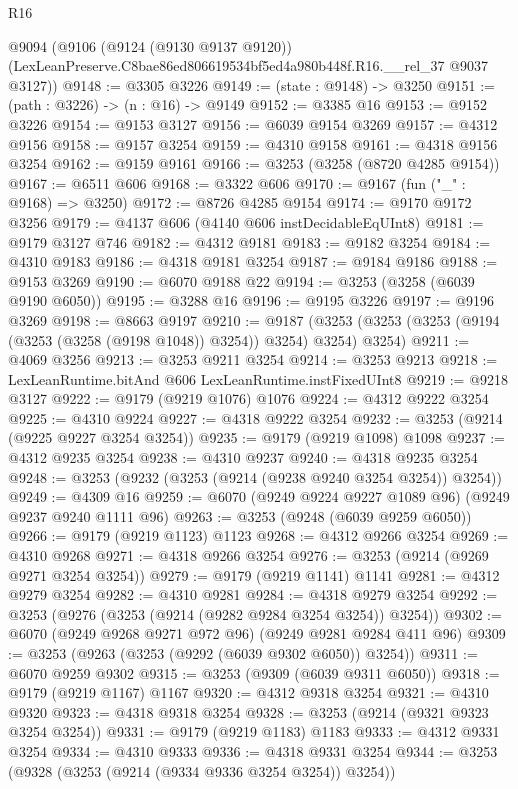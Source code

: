 \begin{lexlean}{R16}
\begin{coremodule}
  @9094
    (@9106
      (@9124 (@9130 @9137 @9120))
      (LexLeanPreserve.C8bae86ed806619534bf5ed4a980b448f.R16.__rel_37 @9037 @3127))
@9148 := @3305 @3226
@9149 := (state : @9148) -> @3250
@9151 := (path : @3226) -> (n : @16) -> @9149
@9152 := @3385 @16
@9153 := @9152 @3226
@9154 := @9153 @3127
@9156 := @6039 @9154 @3269
@9157 := @4312 @9156
@9158 := @9157 @3254
@9159 := @4310 @9158
@9161 := @4318 @9156 @3254
@9162 := @9159 @9161
@9166 := @3253 (@3258 (@8720 @4285 @9154))
@9167 := @6511 @606
@9168 := @3322 @606
@9170 := @9167 (fun ("_" : @9168) => @3250)
@9172 := @8726 @4285 @9154
@9174 := @9170 @9172 @3256
@9179 := @4137 @606 (@4140 @606 instDecidableEqUInt8)
@9181 := @9179 @3127 @746
@9182 := @4312 @9181
@9183 := @9182 @3254
@9184 := @4310 @9183
@9186 := @4318 @9181 @3254
@9187 := @9184 @9186
@9188 := @9153 @3269
@9190 := @6070 @9188 @22
@9194 := @3253 (@3258 (@6039 @9190 @6050))
@9195 := @3288 @16
@9196 := @9195 @3226
@9197 := @9196 @3269
@9198 := @8663 @9197
@9210 := @9187 (@3253 (@3253 (@3253 (@9194 (@3253 (@3258 (@9198 @1048)) @3254)) @3254) @3254) @3254)
@9211 := @4069 @3256
@9213 := @3253 @9211 @3254
@9214 := @3253 @9213
@9218 := LexLeanRuntime.bitAnd @606 LexLeanRuntime.instFixedUInt8
@9219 := @9218 @3127
@9222 := @9179 (@9219 @1076) @1076
@9224 := @4312 @9222 @3254
@9225 := @4310 @9224
@9227 := @4318 @9222 @3254
@9232 := @3253 (@9214 (@9225 @9227 @3254 @3254))
@9235 := @9179 (@9219 @1098) @1098
@9237 := @4312 @9235 @3254
@9238 := @4310 @9237
@9240 := @4318 @9235 @3254
@9248 := @3253 (@9232 (@3253 (@9214 (@9238 @9240 @3254 @3254)) @3254))
@9249 := @4309 @16
@9259 := @6070 (@9249 @9224 @9227 @1089 @96) (@9249 @9237 @9240 @1111 @96)
@9263 := @3253 (@9248 (@6039 @9259 @6050))
@9266 := @9179 (@9219 @1123) @1123
@9268 := @4312 @9266 @3254
@9269 := @4310 @9268
@9271 := @4318 @9266 @3254
@9276 := @3253 (@9214 (@9269 @9271 @3254 @3254))
@9279 := @9179 (@9219 @1141) @1141
@9281 := @4312 @9279 @3254
@9282 := @4310 @9281
@9284 := @4318 @9279 @3254
@9292 := @3253 (@9276 (@3253 (@9214 (@9282 @9284 @3254 @3254)) @3254))
@9302 := @6070 (@9249 @9268 @9271 @972 @96) (@9249 @9281 @9284 @411 @96)
@9309 := @3253 (@9263 (@3253 (@9292 (@6039 @9302 @6050)) @3254))
@9311 := @6070 @9259 @9302
@9315 := @3253 (@9309 (@6039 @9311 @6050))
@9318 := @9179 (@9219 @1167) @1167
@9320 := @4312 @9318 @3254
@9321 := @4310 @9320
@9323 := @4318 @9318 @3254
@9328 := @3253 (@9214 (@9321 @9323 @3254 @3254))
@9331 := @9179 (@9219 @1183) @1183
@9333 := @4312 @9331 @3254
@9334 := @4310 @9333
@9336 := @4318 @9331 @3254
@9344 := @3253 (@9328 (@3253 (@9214 (@9334 @9336 @3254 @3254)) @3254))

\end{coremodule}
\end{lexlean}
